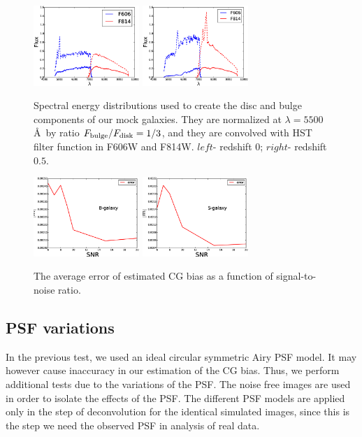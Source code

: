 \documentclass[useAMS,usenatbib]{mn2e}
\begin{document}
%
\begin{figure}
\centerline{\includegraphics[width=4.0cm]{z0bandsed.eps}
\includegraphics[width=4.0cm]{z5bandsed.eps}}
\caption{Spectral energy distributions used to create the disc and
  bulge components of our mock galaxies. They are normalized at
  $\lambda=5500$\AA$\,$ by ratio $F_{\rm bulge}/F_{\rm disk}=1/3$, and they
  are convolved with HST filter function in F606W and F814W. $left$-
  redshift $0$; $right$- redshift $0.5$.}
\label{fig:sedz}
\end{figure}

%
\begin{figure}
\centerline{\includegraphics[width=4.0cm]{zcg2nrB.eps}
\includegraphics[width=4.0cm]{zcg2nrS.eps}}
\caption{The average error of estimated CG bias as a function of
  signal-to-noise ratio.  }
\label{fig:err2snr}
\end{figure}

\subsection{PSF variations}

In the previous test, we used an ideal circular symmetric Airy PSF
model. It may however cause inaccuracy in our estimation of the CG
bias. Thus, we perform additional tests due to the variations of the
PSF. The noise free images are used in order to isolate the effects of
the PSF. The different PSF models are applied only in the step of
deconvolution for the identical simulated images, since this is the
step we need the observed PSF in analysis of real data.
\end{document}
